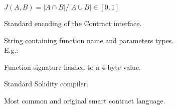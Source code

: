 \documentclass[../main.tex]{subfiles}
\begin{document}
\begin{description}[style=unboxed,leftmargin=0pt]
  \item[Jaccard index] \(J(A,B) = |A \cap B| / |A \cup B| \in [0,1]\)
  \item[ABI] Standard encoding of the Contract interface.
  \item[Function signature] String containing function name and parameters types.\\E.g.: 
  \item[Fourbyte signature] Function signature hashed to a 4-byte value.
  \item[solc] Standard Solidity compiler.
  \item[Solidity] Most common and original smart contract language.
\end{description}
\end{document}
